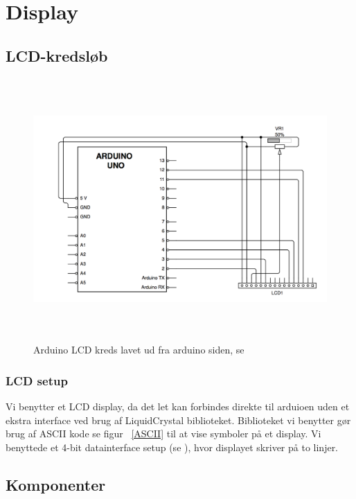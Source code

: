 \section{Display}

\subsection{LCD-kredsløb}
\begin{figure}[H]
	\centering
    \includegraphics[height=10cm]{figures/CIRCUITS/LCDFinal.png}
	\caption{Arduino LCD kreds lavet ud fra arduino siden, se \cite{arduinoLCD}}
	\label{arduinoLCD}
\end{figure}
\subsubsection{LCD setup}
Vi benytter et LCD display, da det let kan forbindes direkte til arduioen uden et ekstra interface ved brug af LiquidCrystal biblioteket. Biblioteket vi benytter gør brug af ASCII kode se figur ~\ref{ASCII} til at vise symboler på et display.
Vi benyttede et 4-bit datainterface setup (se \cite{arduinoLCD}), hvor displayet skriver på to linjer.


\subsection{Komponenter}

